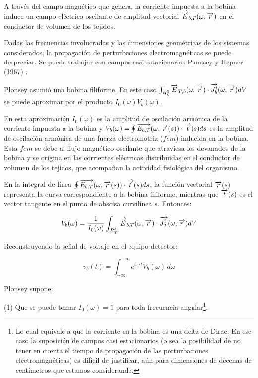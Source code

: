 \begin{sloppypar}

A través del campo magnético que genera, la corriente impuesta a la bobina induce un campo eléctrico oscilante de amplitud vectorial ${\overrightarrow{E}_{b,T}(\omega,\overrightarrow{r})}$ en el conductor de volumen de los tejidos.

Dadas las frecuencias involucradas y las dimensiones geométricas de los sistemas considerados, la propagación de perturbaciones electromagnéticas se puede despreciar. Se puede trabajar con campos casi-estacionarios Plomsey y Hepner (1967) \citep{Plomsey_1967}.

Plonsey asumió una bobina filiforme. En este caso \citep{Plonsey_1972} ${\int_{R^{3}_{b}}\overrightarrow{E}_{T,b}(\omega,\overrightarrow{r}) \cdot \overrightarrow{J_{b}^{i}}(\omega,\overrightarrow{r}) dV}$ se puede aproximar por el producto ${I_{0}(\omega)V_{b}(\omega)}$.

En esta aproximación $I_{0}(\omega)$ es la amplitud de oscilación armónica de la corriente impuesta a la bobina y ${V_{b}(\omega)= \oint \overrightarrow{E_{b,T}}(\omega,\overrightarrow{r}(s))\cdot \overrightarrow{t}(s) ds}$ es la amplitud de oscilación armónica de una fuerza electromotriz ($fem$) inducida en la bobina.
Esta $fem$ se debe al flujo magnético oscilante que atraviesa los devanados de la bobina y se origina en las corrientes eléctricas distribuidas en el conductor de volumen de los tejidos, que acompañan la actividad fisiológica del organismo.

En la integral de línea ${\oint \overrightarrow{E_{b,T}}(\omega,\overrightarrow{r}(s))\cdot \overrightarrow{t}(s) ds}$, la función vectorial $\overrightarrow{r}(s)$ representa la curva correspondiente a la bobina filiforme, mientras que $\overrightarrow{t}(s)$ es el vector tangente en el punto de abscisa curvilínea $s$. Entonces: 

\begin{equation}
	V_{b}(\omega) = \dfrac{1}{I_{0}(\omega)} \int_{R^{3}_{T}}\overrightarrow{E}_{b,T}(\omega,\overrightarrow{r}) \cdot \overrightarrow{J_{T}^{i}}(\omega,\overrightarrow{r}) dV
\end{equation}

Reconstruyendo la señal de voltaje en el equipo detector:

\begin{equation}
	v_{b}(t) =  \int_{-\infty}^{+\infty} e^{i\,\omega\,t} V_{b}(\omega)\,d\omega 
\end{equation}

\end{sloppypar}

Plonsey supone:

(1) Que se puede tomar $I_{0}(\omega)=1$ para toda frecuencia angular\footnote{Lo cual equivale a que la corriente en la bobina es una delta de Dirac. En ese caso la suposición de campos casi estacionarios (o sea la posibilidad de no tener en cuenta el tiempo de propagación de las perturbaciones electromagnéticas) es difícil de justificar, aún para dimensiones de decenas de centímetros que estamos considerando.}.

